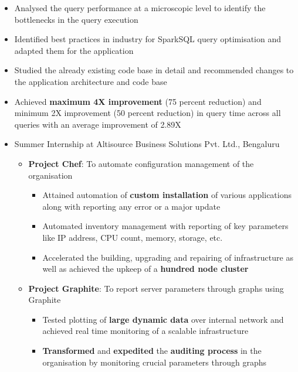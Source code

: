 \documentclass{article}
\begin{document}
\begin{itemize}[leftmargin=0.07cm]
\begin{itemize}[leftmargin=0.07cm]
\begin{itemize}
	\item Analysed the query performance at a microscopic level to identify the bottlenecks in the query execution
	\item Identified best practices in industry for SparkSQL query optimisation and adapted them for the application
	\item Studied the already existing code base in detail and recommended changes to the application architecture and code base
    \item Achieved \textbf{maximum 4X improvement} (75 percent reduction) and minimum 2X improvement (50 percent reduction) in query time across all queries with an average improvement of 2.89X
    \end{itemize}
\end{itemize}
\end{itemize}
\renewcommand{\labelitemi}{}
\renewcommand\labelitemii{$\circ$}
\renewcommand{\labelitemiii}{$\bullet$}
\begin{itemize}[leftmargin=0.07cm]
\item {\large Summer Internship at Altisource Business Solutions Pvt. Ltd., Bengaluru}\hspace*{\fill}
\vspace{-0cm}
	\begin{itemize}[leftmargin=0.07cm]
	\item \textbf{Project Chef}: To automate configuration management of the organisation\\
	\vspace{-0.2cm}
	\begin{itemize}
	\item Attained automation of \textbf{custom installation} of various applications along with reporting any error or a major update
	\item Automated inventory management with reporting  of key parameters like IP address, CPU count, memory, storage, etc.
    \item Accelerated the building, upgrading and repairing of infrastructure as well as achieved the upkeep of a \textbf{hundred node cluster} \end{itemize}
	\vspace{0cm}
	\item \textbf{Project Graphite}: To report server parameters through graphs using Graphite\\
	\vspace{-0.2cm}
	\begin{itemize}
	\item Tested plotting of \textbf{large dynamic data} over internal network and achieved real time monitoring of a scalable infrastructure 
	\item \textbf{Transformed} and \textbf{expedited} the \textbf{auditing process} in the organisation by monitoring crucial parameters through graphs 
	\end{itemize}
	
	\end{itemize}
\end{itemize}
\end{document}
